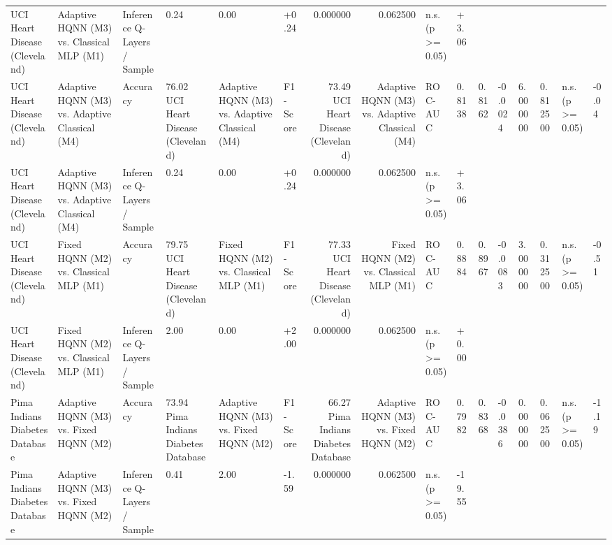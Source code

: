 \begin{table}
\begin{tabular}{llllllrrll}
UCI Heart Disease (Cleveland) & Adaptive HQNN (M3) vs. Classical MLP (M1) & Inference Q-Layers / Sample & 0.24 & 0.00 & +0.24 & 0.000000 & 0.062500 & n.s. (p >= 0.05) & +3.06 \\
UCI Heart Disease (Cleveland) & Adaptive HQNN (M3) vs. Adaptive Classical (M4) & Accuracy & 76.02%
UCI Heart Disease (Cleveland) & Adaptive HQNN (M3) vs. Adaptive Classical (M4) & F1-Score & 73.49%
UCI Heart Disease (Cleveland) & Adaptive HQNN (M3) vs. Adaptive Classical (M4) & ROC-AUC & 0.8138 & 0.8162 & -0.0024 & 6.000000 & 0.812500 & n.s. (p >= 0.05) & -0.04 \\
UCI Heart Disease (Cleveland) & Adaptive HQNN (M3) vs. Adaptive Classical (M4) & Inference Q-Layers / Sample & 0.24 & 0.00 & +0.24 & 0.000000 & 0.062500 & n.s. (p >= 0.05) & +3.06 \\
UCI Heart Disease (Cleveland) & Fixed HQNN (M2) vs. Classical MLP (M1) & Accuracy & 79.75%
UCI Heart Disease (Cleveland) & Fixed HQNN (M2) vs. Classical MLP (M1) & F1-Score & 77.33%
UCI Heart Disease (Cleveland) & Fixed HQNN (M2) vs. Classical MLP (M1) & ROC-AUC & 0.8884 & 0.8967 & -0.0083 & 3.000000 & 0.312500 & n.s. (p >= 0.05) & -0.51 \\
UCI Heart Disease (Cleveland) & Fixed HQNN (M2) vs. Classical MLP (M1) & Inference Q-Layers / Sample & 2.00 & 0.00 & +2.00 & 0.000000 & 0.062500 & n.s. (p >= 0.05) & +0.00 \\
Pima Indians Diabetes Database & Adaptive HQNN (M3) vs. Fixed HQNN (M2) & Accuracy & 73.94%
Pima Indians Diabetes Database & Adaptive HQNN (M3) vs. Fixed HQNN (M2) & F1-Score & 66.27%
Pima Indians Diabetes Database & Adaptive HQNN (M3) vs. Fixed HQNN (M2) & ROC-AUC & 0.7982 & 0.8368 & -0.0386 & 0.000000 & 0.062500 & n.s. (p >= 0.05) & -1.19 \\
Pima Indians Diabetes Database & Adaptive HQNN (M3) vs. Fixed HQNN (M2) & Inference Q-Layers / Sample & 0.41 & 2.00 & -1.59 & 0.000000 & 0.062500 & n.s. (p >= 0.05) & -19.55 \\

\end{tabular}
\end{table}
